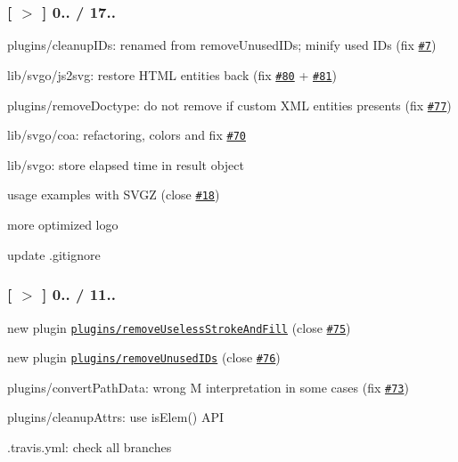 \subsubsection*{\mbox{[} \href{https://github.com/svg/svgo/tree/v0.1.9}{\tt $>$} \mbox{]} 0.. / 17..}


\begin{DoxyItemize}
\item plugins/cleanup\+I\+Ds\+: renamed from remove\+Unused\+I\+Ds; minify used I\+Ds (fix \href{https://github.com/svg/svgo/issues/7}{\tt \#7})
\item lib/svgo/js2svg\+: restore H\+T\+ML entities back (fix \href{https://github.com/svg/svgo/issues/80}{\tt \#80} + \href{https://github.com/svg/svgo/issues/81}{\tt \#81})
\item plugins/remove\+Doctype\+: do not remove if custom X\+ML entities presents (fix \href{https://github.com/svg/svgo/issues/77}{\tt \#77})
\item lib/svgo/coa\+: refactoring, colors and fix \href{https://github.com/svg/svgo/issues/70}{\tt \#70}
\item lib/svgo\+: store elapsed time in result object
\item usage examples with S\+V\+GZ (close \href{https://github.com/svg/svgo/issues/18}{\tt \#18})
\item more optimized logo
\item update {\ttfamily .gitignore}
\end{DoxyItemize}

\subsubsection*{\mbox{[} \href{https://github.com/svg/svgo/tree/v0.1.8}{\tt $>$} \mbox{]} 0.. / 11..}


\begin{DoxyItemize}
\item new plugin \href{https://github.com/svg/svgo/blob/master/plugins/removeUselessStrokeAndFill.js}{\tt plugins/remove\+Useless\+Stroke\+And\+Fill} (close \href{https://github.com/svg/svgo/issues/75}{\tt \#75})
\item new plugin \href{https://github.com/svg/svgo/blob/master/plugins/removeUnusedIDs.js}{\tt plugins/remove\+Unused\+I\+Ds} (close \href{https://github.com/svg/svgo/issues/76}{\tt \#76})
\item plugins/convert\+Path\+Data\+: wrong M interpretation in some cases (fix \href{https://github.com/svg/svgo/issues/73}{\tt \#73})
\item plugins/cleanup\+Attrs\+: use {\ttfamily is\+Elem()} A\+PI
\item {\ttfamily .travis.\+yml}\+: check all branches
\end{DoxyItemize}

